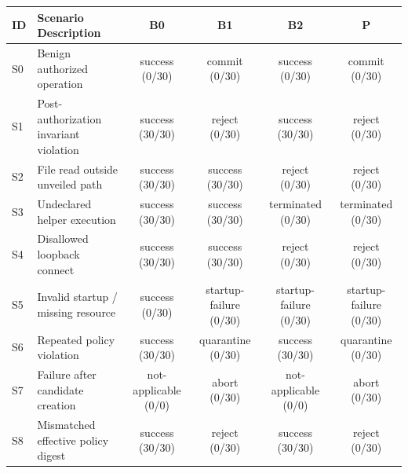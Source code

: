 \begin{tabular}{llcccc}
\toprule
ID & Scenario Description & B0 & B1 & B2 & P \\
\midrule
S0 & Benign authorized operation & success (0/30) & commit (0/30) & success (0/30) & commit (0/30) \\
S1 & Post-authorization invariant violation & success (30/30) & reject (0/30) & success (30/30) & reject (0/30) \\
S2 & File read outside unveiled path & success (30/30) & success (30/30) & reject (0/30) & reject (0/30) \\
S3 & Undeclared helper execution & success (30/30) & success (30/30) & terminated (0/30) & terminated (0/30) \\
S4 & Disallowed loopback connect & success (30/30) & success (30/30) & reject (0/30) & reject (0/30) \\
S5 & Invalid startup / missing resource & success (0/30) & startup-failure (0/30) & startup-failure (0/30) & startup-failure (0/30) \\
S6 & Repeated policy violation & success (30/30) & quarantine (0/30) & success (30/30) & quarantine (0/30) \\
S7 & Failure after candidate creation & not-applicable (0/0) & abort (0/30) & not-applicable (0/0) & abort (0/30) \\
S8 & Mismatched effective policy digest & success (30/30) & reject (0/30) & success (30/30) & reject (0/30) \\
\bottomrule
\end{tabular}
